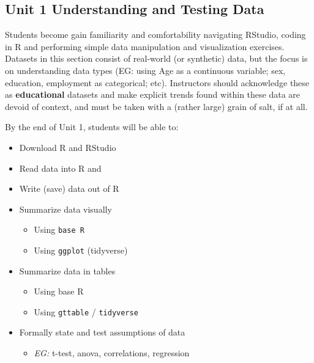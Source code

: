 \documentclass[
]{book}
\providecommand{\tightlist}{%
  \setlength{\itemsep}{0pt}\setlength{\parskip}{0pt}}
\begin{document}
\hypertarget{unit-1-understanding-and-testing-data}{%
\subsection*{Unit 1 Understanding and Testing Data}\label{unit-1-understanding-and-testing-data}}

Students become gain familiarity and comfortability navigating RStudio, coding in R and performing simple data manipulation and visualization exercises. Datasets in this section consist of real-world (or synthetic) data, but the focus is on understanding data types (EG: using Age as a continuous variable; sex, education, employment as categorical; etc). Instructors should acknowledge these as \textbf{educational} datasets and make explicit trends found within these data are devoid of context, and must be taken with a (rather large) grain of salt, if at all.

By the end of Unit 1, students will be able to:

\begin{itemize}
\tightlist
\item
  Download R and RStudio
\item
  Read data into R and
\item
  Write (save) data out of R
\item
  Summarize data visually

  \begin{itemize}
  \tightlist
  \item
    Using \texttt{base\ R}
  \item
    Using \texttt{ggplot} (tidyverse)
  \end{itemize}
\item
  Summarize data in tables

  \begin{itemize}
  \tightlist
  \item
    Using base R
  \item
    Using \texttt{gttable} / \texttt{tidyverse}
  \end{itemize}
\item
  Formally state and test assumptions of data

  \begin{itemize}
  \tightlist
  \item
    \emph{EG:} t-test, anova, correlations, regression
  \end{itemize}
\end{itemize}
\end{document}
